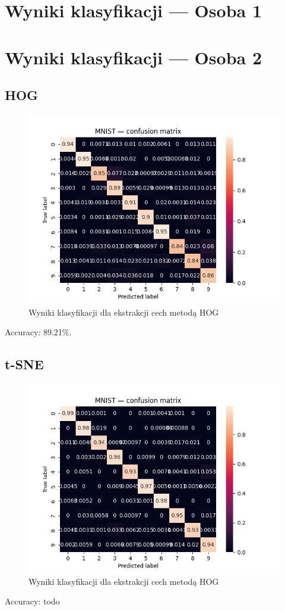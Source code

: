\documentclass[10pt]{article}
\begin{document}
\pagebreak

\section{Wyniki klasyfikacji --- Osoba 1}
\pagebreak

\section{Wyniki klasyfikacji --- Osoba 2}

\subsection{HOG}

\begin{figure}[H]
    \centering
    \includegraphics[width=.7\linewidth]{img/mnist_hog_cm.png}
    \caption{Wyniki klasyfikacji dla ekstrakcji cech metodą HOG}
\end{figure}

Accuracy: 89.21\%.

\subsection{t-SNE}

\begin{figure}[H]
    \centering
    \includegraphics[width=.7\linewidth]{img/mnist_tsne_cm.png}
    \caption{Wyniki klasyfikacji dla ekstrakcji cech metodą HOG}
\end{figure}

Accuracy: todo
\end{document}
